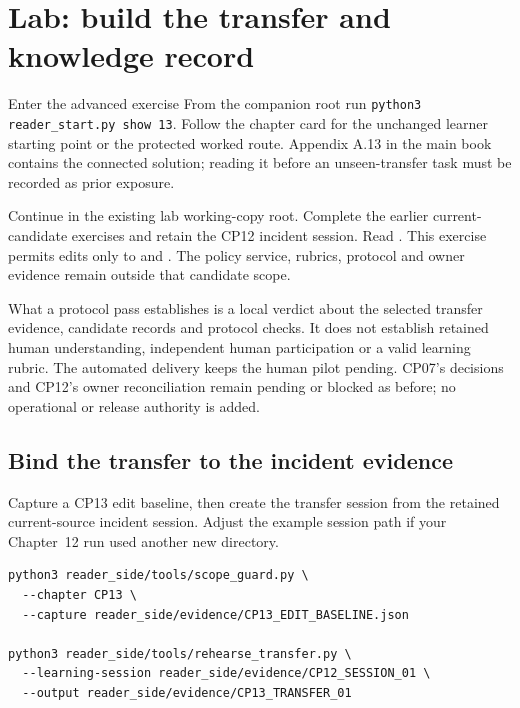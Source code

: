 \section{Lab: build the transfer and knowledge record}
\begin{readerbox}{Enter the advanced exercise}
From the companion root run \texttt{python3 reader\_start.py show 13}. Follow the chapter card for the unchanged learner starting point or the protected worked route. Appendix A.13 in the main book contains the connected solution; reading it before an unseen-transfer task must be recorded as prior exposure.
\end{readerbox}

\label{sec:ch13-lab}

Continue in the existing lab working-copy root. Complete the earlier current-candidate exercises and retain the CP12 incident session. Read . This exercise permits edits only to  and . The policy service, rubrics, protocol and owner evidence remain outside that candidate scope.

\begin{warningbox}{What a protocol pass establishes}
 is a local verdict about the selected transfer evidence, candidate records and protocol checks. It does not establish retained human understanding, independent human participation or a valid learning rubric. The automated delivery keeps the human pilot pending. CP07's decisions and CP12's owner reconciliation remain pending or blocked as before; no operational or release authority is added.
\end{warningbox}

\subsection{Bind the transfer to the incident evidence}

Capture a CP13 edit baseline, then create the transfer session from the retained current-source incident session. Adjust the example session path if your Chapter~12 run used another new directory.

\begin{lstlisting}
python3 reader_side/tools/scope_guard.py \
  --chapter CP13 \
  --capture reader_side/evidence/CP13_EDIT_BASELINE.json

python3 reader_side/tools/rehearse_transfer.py \
  --learning-session reader_side/evidence/CP12_SESSION_01 \
  --output reader_side/evidence/CP13_TRANSFER_01
\end{lstlisting}

